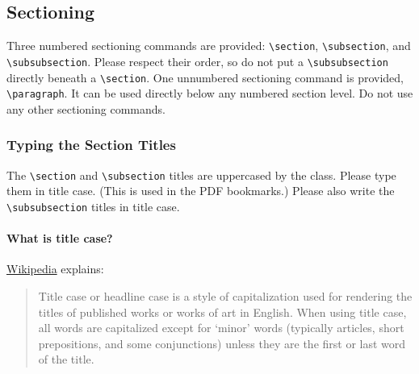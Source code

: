 \documentclass{uai2021} %
\begin{document}
\subsection{Sectioning}
Three numbered sectioning commands are provided: \verb|\section|, \verb|\subsection|, and \verb|\subsubsection|.
Please respect their order, so do not put a \verb|\subsubsection| directly beneath a \verb|\section|.
One unnumbered sectioning command is provided, \verb|\paragraph|.
It can be used directly below any numbered section level.
Do not use any other sectioning commands.

\subsubsection{Typing the Section Titles}
The \verb|\section| and \verb|\subsection| titles are uppercased by the class.
Please type them in title case.
(This is used in the PDF bookmarks.)
Please also write the \verb|\subsubsection| titles in title case.

\paragraph{What is title case?}
\href{https://en.wikipedia.org/wiki/Title_case}{Wikipedia} explains:
\begin{quote}
    Title case or headline case is a style of capitalization used for rendering the titles of published works or works of art in English.
    When using title case, all words are capitalized except for ‘minor’ words (typically articles, short prepositions, and some conjunctions) unless they are the first or last word of the title.
\end{quote}
\end{document}
